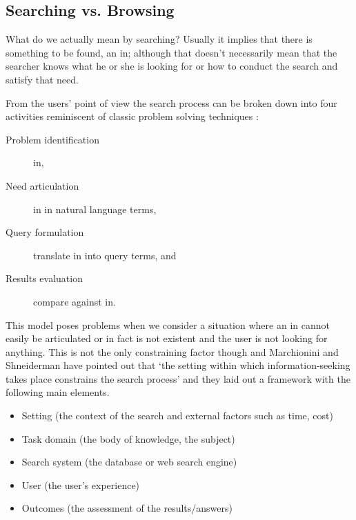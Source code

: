 

\subsection{Searching vs. Browsing}


What do we actually mean by searching? Usually it implies that there is something to be found, an \gls{in}; although that doesn’t necessarily mean that the searcher knows what he or she is looking for or how to conduct the search and satisfy that need.

From the users' point of view the search process can be broken down into four activities \autocite{Sutcliffe1998} reminiscent of classic problem solving techniques \autocite{Polya1957}:

\begin{description}
  \item [Problem identification] \gls{in},
  \item [Need articulation] \gls{in} in natural language terms,
  \item [Query formulation] translate \gls{in} into query terms, and
  \item [Results evaluation] compare against \gls{in}.
\end{description}

This model poses problems when we consider a situation where an \gls{in} cannot easily be articulated or in fact is not existent and the user is not looking for anything. This is not the only constraining factor though and Marchionini and Shneiderman have pointed out that `the setting within which information-seeking takes place constrains the search process' \autocite{Marchionini1988} and they laid out a framework with the following main elements.

\begin{itemize}
  \item Setting (the context of the search and external factors such as time, cost)
  \item Task domain (the body of knowledge, the subject)
  \item Search system (the database or web search engine)
  \item User (the user’s experience)
  \item Outcomes (the assessment of the results/answers)
\end{itemize}


